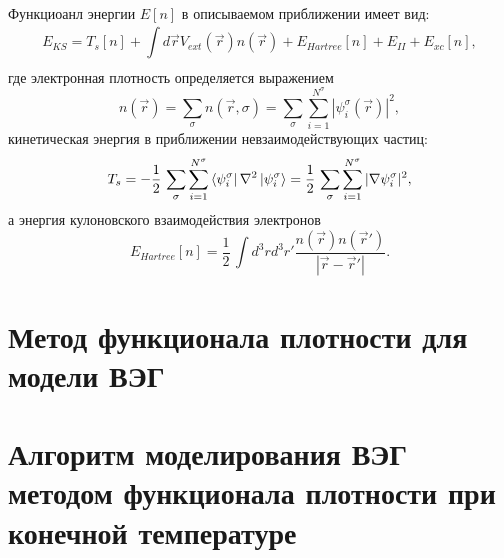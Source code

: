 Функциоанл энергии $E[n]$ в описываемом приближении имеет вид:
\begin{equation}
    \label{eq:dft:E_KS-def}
    E_{KS} = T_{s} [n] + \int\limits_{}^{} d \vec{r} V_{ext} (\vec{r}) n(\vec{r}) + E_{Hartree} [n] + E_{II}  + E_{xc} [n],  
\end{equation}
где электронная плотность определяется выражением
\begin{equation}
    \label{eq:dft:density-kohn}
    n (\vec{r}) = \sum\limits_{\sigma}^{} n(\vec{r}, \sigma) = \sum\limits_{\sigma}^{} \sum\limits_{i=1}^{N^{\sigma} } |\psi_i^{\sigma} (\vec{r})|^2, 
\end{equation}
кинетическая энергия в приближении невзаимодействующих частиц:
\begin{equation}
     \label{eq:dft:T_s-def}
     T_{s}  = - \frac{1}{2}\, \sum\limits_{\sigma}^{}\sum\limits_{i=1}^{N^{\sigma}} \bra{\psi_i^{\sigma} } \nabla^2 \ket{\psi_i^{\sigma}} 
      = \frac{1}{2}\, \sum\limits_{\sigma}^{} \sum\limits_{i=1}^{N^{\sigma} } |\nabla \psi_i^{\sigma} |^2,
 \end{equation}
 а энергия кулоновского взаимодействия электронов
 \begin{equation}
     \label{eq:dft:E_Hartree-def}
     E_{Hartree} [n] = \frac{1}{2}\, \int\limits_{}^{}d^3 r d^3 r' \frac{n(\vec{r}) n(\vec{r}')}{|\vec{r} - \vec{r}'|}.
 \end{equation}

\section{Метод функционала плотности для модели ВЭГ}

\section{Алгоритм моделирования ВЭГ методом функционала плотности при конечной температуре}
